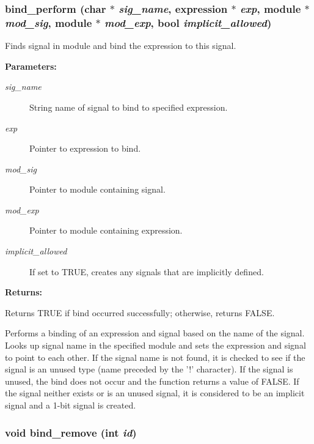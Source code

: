 \subsubsection{ bind\_\-perform (char $\ast$ {\em sig\_\-name}, {\bf expression} $\ast$ {\em exp}, {\bf module} $\ast$ {\em mod\_\-sig}, {\bf module} $\ast$ {\em mod\_\-exp}, {\bf bool} {\em implicit\_\-allowed})}\label{binding_8h_a2}


Finds signal in module and bind the expression to this signal.

\begin{Desc}
\item[{\bf Parameters: }]\par
\begin{description}
\item[
{\em sig\_\-name}]String name of signal to bind to specified expression. \item[
{\em exp}]Pointer to expression to bind. \item[
{\em mod\_\-sig}]Pointer to module containing signal. \item[
{\em mod\_\-exp}]Pointer to module containing expression. \item[
{\em implicit\_\-allowed}]If set to TRUE, creates any signals that are implicitly defined.

\end{description}
\end{Desc}
\begin{Desc}
\item[{\bf Returns: }]\par
Returns TRUE if bind occurred successfully; otherwise, returns FALSE.

\end{Desc}
Performs a binding of an expression and signal based on the name of the signal. Looks up signal name in the specified module and sets the expression and signal to point to each other. If the signal name is not found, it is checked to see if the signal is an unused type (name preceded by the '!' character). If the signal is unused, the bind does not occur and the function returns a value of FALSE. If the signal neither exists or is an unused signal, it is considered to be an implicit signal and a 1-bit signal is created. 
\subsubsection{\setlength{\rightskip}{0pt plus 5cm}void bind\_\-remove (int {\em id})}\label{binding_8h_a1}


